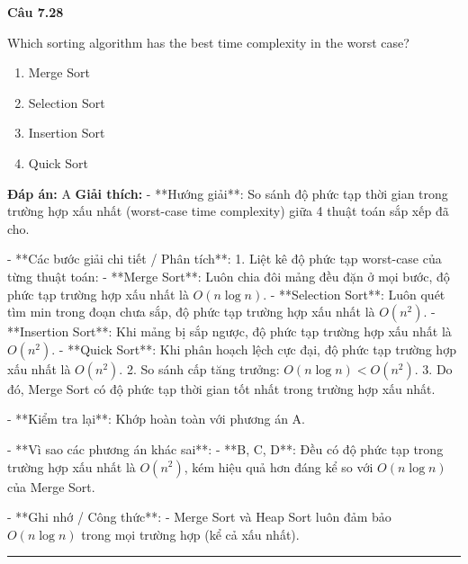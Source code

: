 \documentclass[11pt,a4paper]{article}
\newenvironment{question}[1]{%
  \par\vspace{1em}\noindent\textbf{\large Câu #1}\par\vspace{0.4em}
}{%
  \par\vspace{1em}\hrule\vspace{0.6em}
}
\newenvironment{choices}{%
  \begin{enumerate}[label=\textbf{\Alph*.},leftmargin=2.2em,itemsep=2pt,topsep=3pt]
}{%
  \end{enumerate}
}
\newcommand{\choice}{\item}
\begin{document}
\begin{question}{7.28}
Which sorting algorithm has the best time complexity in the worst case?
\begin{choices}
\choice Merge Sort
\choice Selection Sort
\choice Insertion Sort
\choice Quick Sort
\end{choices}
\textbf{Đáp án:} A
\textbf{Giải thích:} - **Hướng giải**:
  So sánh độ phức tạp thời gian trong trường hợp xấu nhất (worst-case time complexity) giữa 4 thuật toán sắp xếp đã cho.

- **Các bước giải chi tiết / Phân tích**:
  1. Liệt kê độ phức tạp worst-case của từng thuật toán:
     - **Merge Sort**: Luôn chia đôi mảng đều đặn ở mọi bước, độ phức tạp trường hợp xấu nhất là \(O(n \log n)\).
     - **Selection Sort**: Luôn quét tìm min trong đoạn chưa sắp, độ phức tạp trường hợp xấu nhất là \(O(n^2)\).
     - **Insertion Sort**: Khi mảng bị sắp ngược, độ phức tạp trường hợp xấu nhất là \(O(n^2)\).
     - **Quick Sort**: Khi phân hoạch lệch cực đại, độ phức tạp trường hợp xấu nhất là \(O(n^2)\).
  2. So sánh cấp tăng trưởng: \(O(n \log n) < O(n^2)\).
  3. Do đó, Merge Sort có độ phức tạp thời gian tốt nhất trong trường hợp xấu nhất.

- **Kiểm tra lại**:
  Khớp hoàn toàn với phương án A.

- **Vì sao các phương án khác sai**:
  - **B, C, D**: Đều có độ phức tạp trong trường hợp xấu nhất là \(O(n^2)\), kém hiệu quả hơn đáng kể so với \(O(n \log n)\) của Merge Sort.

- **Ghi nhớ / Công thức**:
  - Merge Sort và Heap Sort luôn đảm bảo \(O(n \log n)\) trong mọi trường hợp (kể cả xấu nhất).
\end{question}
\end{document}
